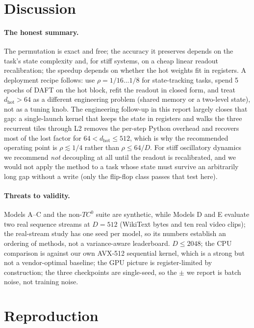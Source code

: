 \documentclass[11pt]{article}
\theoremstyle{definition}
\begin{document}
\section{Discussion}

\paragraph{The honest summary.} The permutation is exact and free; the accuracy it preserves depends on the
task's state complexity and, for stiff systems, on a cheap linear readout recalibration; the speedup depends
on whether the hot weights fit in registers. A deployment recipe follows: use $\rho=1/16\dots1/8$ for
state-tracking tasks, spend 5 epochs of DAFT on the hot block, refit the readout in closed form, and treat
$d_{\text{hot}}>64$ as a different engineering problem (shared memory or a two-level state), not as a tuning
knob. The engineering follow-up in this report largely closes that gap: a single-launch kernel that keeps the
state in registers and walks the three recurrent tiles through L2 removes the per-step Python overhead and
recovers most of the lost factor for $64<d_{\text{hot}}\le512$, which is why the recommended operating point
is $\rho\lesssim1/4$ rather than $\rho\le64/D$. For stiff oscillatory dynamics we recommend \emph{not} decoupling at all until the readout is
recalibrated, and we would not apply the method to a task whose state must survive an arbitrarily long gap
without a write (only the flip-flop class passes that test here).

\paragraph{Threats to validity.} Models A--C and the non-$TC^0$ suite are synthetic, while Models D and E
evaluate two real sequence streams at $D=512$ (WikiText bytes and ten real video clips); the real-stream
study has one seed per model, so its numbers establish an ordering of methods, not a variance-aware
leaderboard. $D\le2048$; the CPU comparison is against our own
AVX-512 sequential kernel, which is a strong but not a vendor-optimal baseline; the GPU picture is
register-limited by construction; the three checkpoints are single-seed, so the $\pm$ we report is batch noise,
not training noise.

\section{Reproduction}
\end{document}
